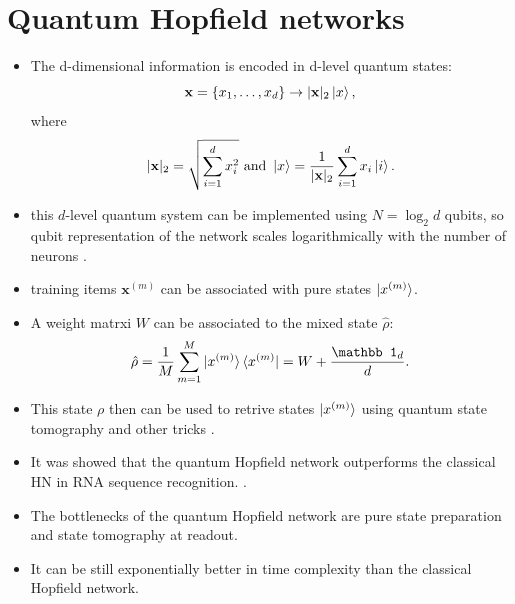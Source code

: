 \documentclass[12pt]{article}
\numberwithin{equation}{section}
\begin{document}
\section*{Quantum Hopfield networks}
\begin{itemize}
    \item The d-dimensional information is encoded in d-level quantum states:
    \begin{equation*}
        \mathbf x = \{x_1,\dots,x_d\}\rightarrow |\mathbf x|_2\ket x,
    \end{equation*}
    where 
    \begin{equation*}
        |\mathbf x|_2 = \sqrt{\sum\limits_{i=1}^d x_i^2}~\textrm{and}~\ket x = \frac{1}{|\mathbf x|_2}\sum\limits_{i=1}^dx_i\ket i.
    \end{equation*}
    \item this $d$-level quantum system can be implemented using $N=\log_2 d$ qubits, so qubit representation of the network
    scales logarithmically with the number of neurons \cite{quantum-hopfield}.
    \item training items $\mathbf x^{(m)}$ can be associated with pure states $\ket{x^{(m)}}$.
    \item A weight matrxi $W$ can be associated to the mixed state $\hat \rho$:
    \begin{equation*}
        \hat \rho = \frac{1}{M}\sum\limits_{m=1}^M\ket{x^{(m)}}\bra{x^{(m)}} = W + \frac{\mathbb 1_d}{d}.
    \end{equation*}
    \item This state $\rho$ then can be used to retrive states $\ket{x^{(m)}}$ using quantum state tomography and other tricks \cite{quantum-hopfield}.
    \item It was showed that the quantum Hopfield network outperforms the classical HN in RNA sequence recognition. \cite{quantum-hopfield}.
    \item The bottlenecks of the quantum Hopfield network are pure state preparation and state tomography at readout.
    \item It can be still exponentially better in time complexity than the classical Hopfield network.
\end{itemize}

\newpage
\end{document}
